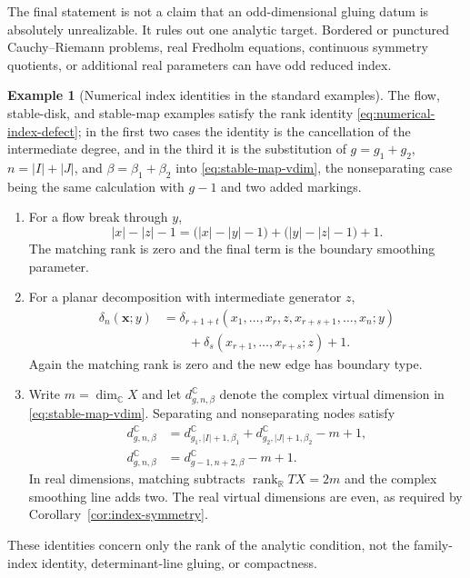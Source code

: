 \documentclass[11pt,letterpaper,twoside]{article}
\theoremstyle{plain}
\theoremstyle{definition}
\newtheorem{example}[theorem]{Example}
\theoremstyle{remark}
\begin{document}
The final statement is not a claim that an odd-dimensional gluing datum is absolutely unrealizable.  It rules out one analytic target.  Bordered or punctured Cauchy--Riemann problems, real Fredholm equations, continuous symmetry quotients, or additional real parameters can have odd reduced index.

\begin{example}[Numerical index identities in the standard examples]\label{ex:index-examples}
The flow, stable-disk, and stable-map examples satisfy the rank identity \eqref{eq:numerical-index-defect}; in the first two cases the identity is the cancellation of the intermediate degree, and in the third it is the substitution of \(g=g_1+g_2\), \(n=|I|+|J|\), and \(\beta=\beta_1+\beta_2\) into \eqref{eq:stable-map-vdim}, the nonseparating case being the same calculation with \(g-1\) and two added markings.
\begin{enumerate}
\item For a flow break through $y$,
\begin{equation}\label{eq:flow-index-gluing}
 |x|-|z|-1
 =\bigl(|x|-|y|-1\bigr)
 +\bigl(|y|-|z|-1\bigr)+1.
\end{equation}
The matching rank is zero and the final term is the boundary smoothing parameter.
\item For a planar decomposition with intermediate generator $z$,
\begin{equation}\label{eq:ainf-index-gluing}
\begin{aligned}
 \delta_n(\mathbf x;y)
 &={}
 \delta_{r+1+t}
 (x_1,\ldots,x_r,z,x_{r+s+1},\ldots,x_n;y)
 \\
 &\hspace{2em}{}
 +\delta_s(x_{r+1},\ldots,x_{r+s};z)+1.
\end{aligned}
\end{equation}
Again the matching rank is zero and the new edge has boundary type.
\item Write $m=\dim_{\mathbb C}X$ and let $d^{\mathbb C}_{g,n,\beta}$ denote the complex virtual dimension in \eqref{eq:stable-map-vdim}.  Separating and nonseparating nodes satisfy
\begin{align}
 d^{\mathbb C}_{g,n,\beta}
 &=d^{\mathbb C}_{g_1,|I|+1,\beta_1}
 +d^{\mathbb C}_{g_2,|J|+1,\beta_2}-m+1,
 \label{eq:stable-map-separating-index}\\
 d^{\mathbb C}_{g,n,\beta}
 &=d^{\mathbb C}_{g-1,n+2,\beta}-m+1.
 \label{eq:stable-map-nonseparating-index}
\end{align}
In real dimensions, matching subtracts $\operatorname{rank}_{\mathbb R}TX=2m$ and the complex smoothing line adds two.  The real virtual dimensions are even, as required by Corollary~\ref{cor:index-symmetry}.
\end{enumerate}
These identities concern only the rank of the analytic condition, not the family-index identity, determinant-line gluing, or compactness.
\end{example}
\end{document}
